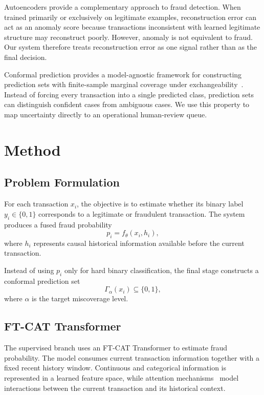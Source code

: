 \documentclass[conference]{IEEEtran}
\begin{document}
Autoencoders provide a complementary approach to fraud detection. When trained
primarily or exclusively on legitimate examples, reconstruction error can act as
an anomaly score because transactions inconsistent with learned legitimate
structure may reconstruct poorly. However, anomaly is not equivalent to fraud.
Our system therefore treats reconstruction error as one signal rather than as
the final decision.

Conformal prediction provides a model-agnostic framework for constructing
prediction sets with finite-sample marginal coverage under
exchangeability~\cite{vovk2005algorithmic,angelopoulos2023gentle}. Instead of
forcing every transaction into a single predicted class, prediction sets can
distinguish confident cases from ambiguous cases. We use this property to map
uncertainty directly to an operational human-review queue.

\section{Method}
\label{sec:method}

\subsection{Problem Formulation}

For each transaction $x_i$, the objective is to estimate whether its binary
label $y_i \in \{0,1\}$ corresponds to a legitimate or fraudulent transaction.
The system produces a fused fraud probability
\begin{equation}
p_i = f_{\theta}(x_i,h_i),
\end{equation}
where $h_i$ represents causal historical information available before the
current transaction.

Instead of using $p_i$ only for hard binary classification, the final stage
constructs a conformal prediction set
\begin{equation}
\Gamma_{\alpha}(x_i) \subseteq \{0,1\},
\end{equation}
where $\alpha$ is the target miscoverage level.

\subsection{FT-CAT Transformer}

The supervised branch uses an FT-CAT Transformer to estimate fraud probability.
The model consumes current transaction information together with a fixed recent
history window. Continuous and categorical information is represented in a
learned feature space, while attention mechanisms~\cite{vaswani2017attention}
model interactions between the current transaction and its historical context.
\end{document}

